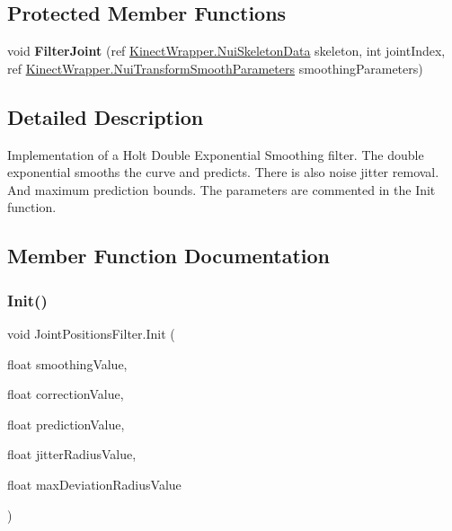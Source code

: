 \subsection*{Protected Member Functions}
\begin{DoxyCompactItemize}
\item 
\mbox{\label{class_joint_positions_filter_a8dcf8fb2da8cfcb5f76599df193f00d5}} 
void {\bfseries Filter\+Joint} (ref \mbox{\hyperlink{struct_kinect_wrapper_1_1_nui_skeleton_data}{Kinect\+Wrapper.\+Nui\+Skeleton\+Data}} skeleton, int joint\+Index, ref \mbox{\hyperlink{struct_kinect_wrapper_1_1_nui_transform_smooth_parameters}{Kinect\+Wrapper.\+Nui\+Transform\+Smooth\+Parameters}} smoothing\+Parameters)
\end{DoxyCompactItemize}


\subsection{Detailed Description}
Implementation of a Holt Double Exponential Smoothing filter. The double exponential smooths the curve and predicts. There is also noise jitter removal. And maximum prediction bounds. The parameters are commented in the Init function. 



\subsection{Member Function Documentation}
\mbox{\label{class_joint_positions_filter_a3815ebb632cddd00240f03a8ba0b429a}} 
\subsubsection{\texorpdfstring{Init()}{Init()}}
{\footnotesize\ttfamily void Joint\+Positions\+Filter.\+Init (\begin{DoxyParamCaption}\item[{float}]{smoothing\+Value,  }\item[{float}]{correction\+Value,  }\item[{float}]{prediction\+Value,  }\item[{float}]{jitter\+Radius\+Value,  }\item[{float}]{max\+Deviation\+Radius\+Value }\end{DoxyParamCaption})}



